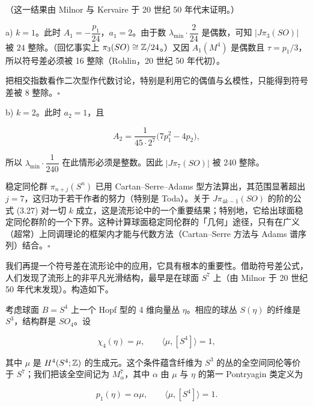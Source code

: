 （这一结果由 Milnor 与 Kervaire 于 20 世纪 50 年代末证明。）

\begin{example}{a)}
$k=1$。此时 $A_1=-\dfrac{p_1}{24}$，$a_1=2$。由于数 $\lambda_{\min}\cdot\dfrac{2}{24}$ 是偶数，可知 $|J\pi_3(SO)|$ 被 $24$ 整除。（回忆事实上 $\pi_3(SO)\cong\mathbb{Z}/24$。）又因 $A_1(M^4)$ 是偶数且 $\tau=p_1/3$，所以符号差必须被 16 整除（Rohlin，20 世纪 50 年代初）。
\end{example}

\begin{remark}{}
把相交指数看作二次型作代数讨论，特别是利用它的偶值与幺模性，只能得到符号差被 8 整除。\hfill$\square$
\end{remark}

\begin{example}{b)}
$k=2$。此时 $a_2=1$，且

\[ A_2=\frac{1}{45\cdot 2^7}\bigl(7p_1^2-4p_2\bigr), \]

所以 $\lambda_{\min}\cdot\dfrac{1}{240}$ 在此情形必须是整数。因此 $|J\pi_7(SO)|$ 被 240 整除。
\end{example}

\begin{remark}{}
稳定同伦群 $\pi_{n+j}(S^n)$ 已用 Cartan--Serre--Adams 型方法算出，其范围显著超出 $j=7$，这归功于若干作者的努力（特别是 Toda）。关于 $J\pi_{4k-1}(SO)$ 的阶的公式 (3.27) 对一切 $k$ 成立，这是流形论中的一个重要结果；特别地，它给出球面稳定同伦群阶的一个下界。这种计算球面稳定同伦群的「几何」途径，只有在广义（超常）上同调理论的框架内才能与代数方法（Cartan--Serre 方法与 Adams 谱序列）结合。\hfill$\square$
\end{remark}

我们再提一个符号差在流形论中的应用，它具有根本的重要性。借助符号差公式，人们发现了流形上的非平凡光滑结构，最早是在球面 $S^7$ 上（由 Milnor 于 20 世纪 50 年代末发现）。构造如下。

考虑球面 $B=S^4$ 上一个 Hopf 型的 4 维向量丛 $\eta$。相应的球丛 $S(\eta)$ 的纤维是 $S^3$，结构群是 $SO_4$。设

\begin{equation}
\chi_4(\eta)=\mu,\qquad \langle\mu,[S^4]\rangle=1, \tag{3.29}
\end{equation}

其中 $\mu$ 是 $H^4(S^4;\mathbb{Z})$ 的生成元。这个条件蕴含纤维为 $S^3$ 的丛的全空间同伦等价于 $S^7$；我们把该全空间记为 $M_\alpha^7$，其中 $\alpha$ 由 $\mu$ 与 $\eta$ 的第一 Pontryagin 类定义为

\[ p_1(\eta)=\alpha\mu,\qquad \langle\mu,[S^4]\rangle=1. \]

